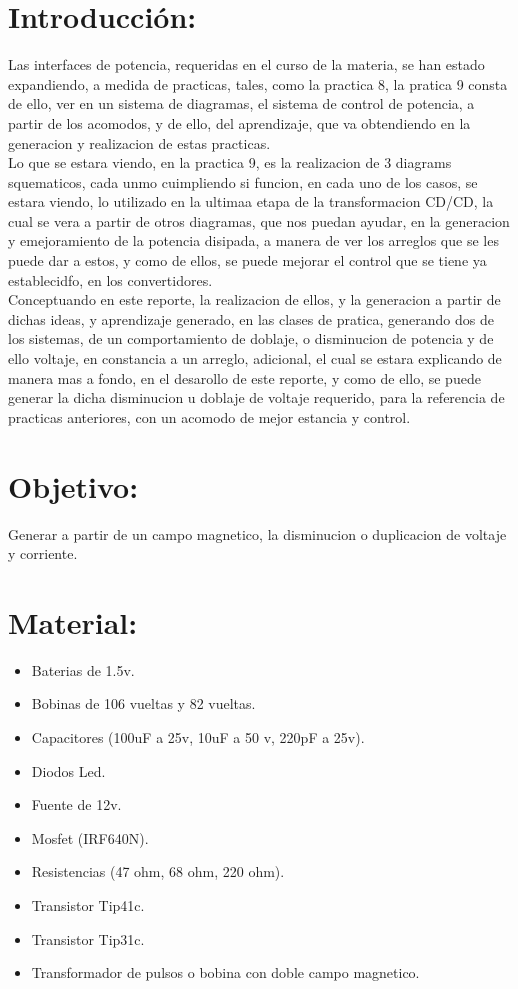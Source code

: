 \documentclass[12pt,a4paper]{article}
\begin{document}
\section{Introducción:}

Las interfaces de potencia, requeridas en el curso de la materia, se han estado expandiendo, a medida de practicas, tales, como la practica 8, la pratica 9 consta de ello, ver en un sistema de diagramas, el sistema de control de potencia, a partir de los acomodos, y de ello, del aprendizaje, que va obtendiendo en la generacion y realizacion de estas practicas.\\

Lo que se estara viendo, en la practica 9, es la realizacion de 3 diagrams squematicos, cada unmo cuimpliendo si funcion, en cada uno de los casos, se estara viendo, lo utilizado en la ultimaa etapa de la transformacion CD/CD, la cual se vera a partir de otros diagramas, que nos puedan ayudar, en la generacion y emejoramiento de la potencia disipada, a manera de ver los arreglos que se les puede dar a estos, y como de ellos, se puede mejorar el control que se tiene ya establecidfo, en los convertidores.\\

Conceptuando en este reporte, la realizacion de ellos, y la generacion a partir de dichas ideas, y aprendizaje generado, en las clases de pratica, generando dos de los sistemas, de un comportamiento de doblaje, o disminucion de potencia y de ello voltaje, en constancia a un arreglo, adicional, el cual se estara explicando de manera mas a fondo, en el desarollo de este reporte, y como de ello, se puede generar la dicha disminucion u doblaje de voltaje requerido, para la referencia de practicas anteriores, con un acomodo de mejor estancia y control. 


\section{Objetivo:}

Generar a partir de un campo magnetico, la disminucion o duplicacion de voltaje y corriente.

\section{Material:}

\begin{itemize}
\item Baterias de 1.5v.
\item Bobinas de 106 vueltas y 82 vueltas.
\item Capacitores (100uF a 25v, 10uF a 50 v, 220pF a 25v).
\item Diodos Led.
\item Fuente de 12v.
\item Mosfet (IRF640N).
\item Resistencias (47 ohm, 68 ohm, 220 ohm).
\item Transistor Tip41c.
\item Transistor Tip31c.
\item Transformador de pulsos o bobina con doble campo magnetico.
\end{itemize}
\newpage
\end{document}
